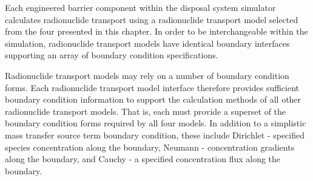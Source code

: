 Each engineered barrier component within the \Cyder disposal system simulator calculates 
radionuclide transport using a radionuclide transport model selected from the four presented in this 
chapter. In order to be interchangeable within the simulation, radionuclide 
transport models have identical boundary interfaces supporting an array of 
boundary condition specifications. 

Radionuclide transport models may rely on a number of boundary condition forms.  
Each radionuclide transport model interface therefore provides sufficient boundary condition 
information to support the calculation methods of all other radionuclide 
transport models. That 
is, each must provide a superset of the boundary condition forms required by all 
four models. In addition to a simplistic mass transfer source term boundary 
condition, these include Dirichlet - specified species concentration along the 
boundary, Neumann - concentration gradients along the boundary, and Cauchy - a
specified concentration flux along the boundary.
